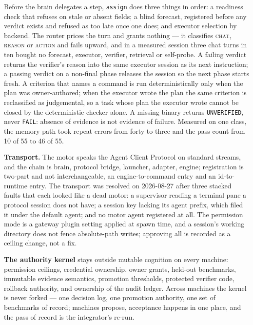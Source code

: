 \documentclass[11pt]{article}
\theoremstyle{definition}
\begin{document}
Before the brain delegates a step, \texttt{assign} does three things in order: a readiness check that refuses on stale or absent fields; a blind forecast, registered before any verdict exists and refused as too late once one does; and executor selection by backend. The router prices the turn and grants nothing --- it classifies \textsc{chat}, \textsc{reason} or \textsc{action} and fails upward, and in a measured session three chat turns in ten bought no forecast, executor, verifier, retrieval or self-probe. A failing verdict returns the verifier's reason into the same executor session as its next instruction; a passing verdict on a non-final phase releases the session so the next phase starts fresh. A criterion that names a command is run deterministically only when the plan was owner-authored; when the executor wrote the plan the same criterion is reclassified as judgemental, so a task whose plan the executor wrote cannot be closed by the deterministic checker alone. A missing binary returns \texttt{UNVERIFIED}, never \texttt{FAIL}: absence of evidence is not evidence of failure. Measured on one class, the memory path took repeat errors from forty to three and the pass count from 10 of 55 to 46 of 55.

\textbf{Transport.} The motor speaks the Agent Client Protocol on standard streams, and the chain is brain, protocol bridge, launcher, adapter, engine; registration is two-part and not interchangeable, an engine-to-command entry and an id-to-runtime entry. The transport was resolved on 2026-08-27 after three stacked faults that each looked like a dead motor: a supervisor reading a terminal pane a protocol session does not have; a session key lacking its agent prefix, which filed it under the default agent; and no motor agent registered at all. The permission mode is a gateway plugin setting applied at spawn time, and a session's working directory does not fence absolute-path writes; approving all is recorded as a ceiling change, not a fix.

\textbf{The authority kernel} stays outside mutable cognition on every machine: permission ceilings, credential ownership, owner grants, held-out benchmarks, immutable evidence semantics, promotion thresholds, protected verifier code, rollback authority, and ownership of the audit ledger. Across machines the kernel is never forked --- one decision log, one promotion authority, one set of benchmarks of record; machines propose, acceptance happens in one place, and the pass of record is the integrator's re-run.
\end{document}
